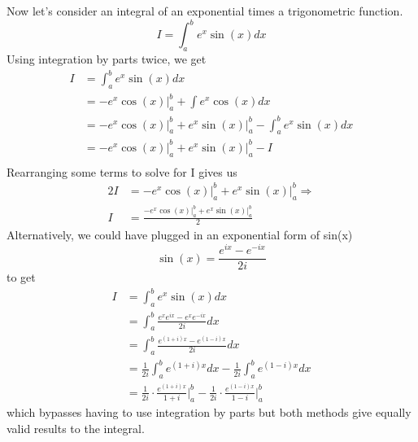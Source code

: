 \documentclass{article}
\newcommand{\be}{\begin{equation}}
\newcommand{\ee}{\end{equation}}
\begin{document}
Now let's consider an integral of an exponential times a trigonometric function.
\be
I = \int_a^b e^x \sin(x) dx
\ee
Using integration by parts twice, we get
\be
  \begin{split}
	  I &= \int_a^b e^x \sin(x) dx \\
	  &= -e^x \cos(x) \Big|_a^b + \int e^x \cos(x) dx \\
	  &= -e^x \cos(x) \Big|_a^b + e^x \sin(x) \Big|_a^b - \int_a^b e^x \sin(x) dx \\
		&= -e^x \cos(x) \Big|_a^b + e^x \sin(x) \Big|_a^b - I \\
  \end{split}
\ee
Rearranging some terms to solve for I gives us
\be
\begin{split}
2I &= -e^x \cos(x) \Big|_a^b + e^x \sin(x) \Big|_a^b \Rightarrow \\
I &= \frac{-e^x \cos(x) \Big|_a^b + e^x \sin(x) \Big|_a^b}{2}
\end{split}
\ee
Alternatively, we could have plugged in an exponential form of sin(x)
\be
\sin(x) = \frac{e^{ix} - e^{-ix}}{2i}
\ee
to get
\be
\begin{split}
I &= \int_a^b e^x \sin(x) dx \\
&= \int_a^b \frac{e^x e^{ix} - e^x e^{-ix}}{2i} dx \\
&= \int_a^b \frac{e^{(1 + i)x} - e^{(1 - i)x} }{2i} dx \\
&= \frac{1}{2i} \int_a^b e^{(1 + i)x} dx - \frac{1}{2i} \int_a^b e^{(1 - i)x} dx \\
&= \frac{1}{2i} \cdot \frac{e^{(1+i)x}}{1+i} \Big|_a^b - \frac{1}{2i} \cdot \frac{e^{(1-i)x}}{1-i} \Big|_a^b
\end{split}
\ee
which bypasses having to use integration by parts but both methods give equally valid results to the integral.
\end{document}

